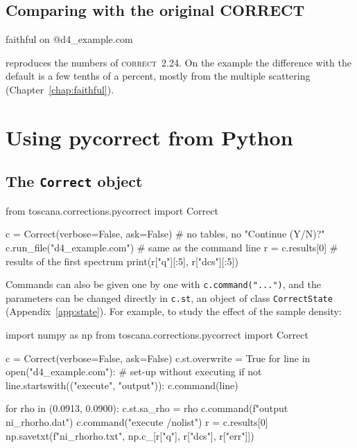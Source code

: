 \documentclass[11pt,a4paper]{report}
\newcommand{\code}[1]{\texttt{#1}}
\newcommand{\cor}{\textsc{correct}}
\begin{document}
\section{Comparing with the original CORRECT}

\begin{com}
faithful on
@d4_example.com
\end{com}
reproduces the numbers of \cor\ 2.24. On the example the difference with the
default is a few tenths of a percent, mostly from the multiple scattering
(Chapter~\ref{chap:faithful}).

\chapter{Using pycorrect from Python}
\label{chap:python}

\section{The \code{Correct} object}

\begin{py}
from toscana.corrections.pycorrect import Correct

c = Correct(verbose=False, ask=False)   # no tables, no "Continue (Y/N)?"
c.run_file("d4_example.com")            # same as the command line
r = c.results[0]                        # results of the first spectrum
print(r["q"][:5], r["dcs"][:5])
\end{py}

Commands can also be given one by one with \code{c.command("...")}, and the
parameters can be changed directly in \code{c.st}, an object of class
\code{CorrectState} (Appendix~\ref{app:state}). For example, to study the effect
of the sample density:

\begin{py}
import numpy as np
from toscana.corrections.pycorrect import Correct

c = Correct(verbose=False, ask=False)
c.st.overwrite = True
for line in open("d4_example.com"):          # set-up without executing
    if not line.startswith(("execute", "output")):
        c.command(line)

for rho in (0.0913, 0.0900):
    c.st.sa_rho = rho
    c.command(f"output ni_rho{rho}.dat")
    c.command("execute /nolist")
    r = c.results[0]
    np.savetxt(f"ni_rho{rho}.txt", np.c_[r["q"], r["dcs"], r["err"]])
\end{py}
\end{document}
